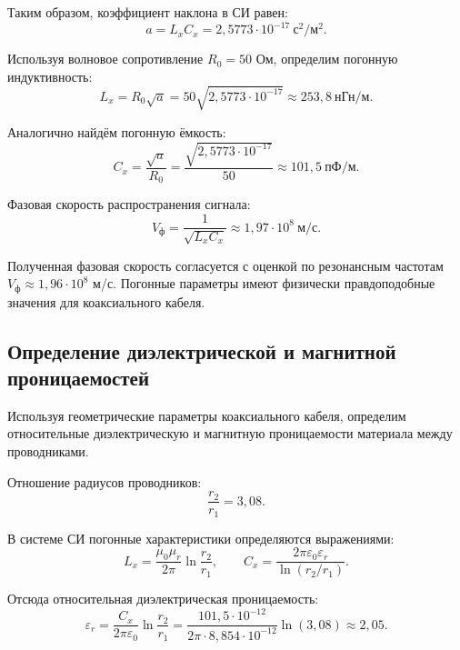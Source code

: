 \documentclass[a4paper,14pt]{extarticle}
\begin{document}
Таким образом, коэффициент наклона в СИ равен:
\begin{equation}
    a = L_xC_x = 2{,}5773\cdot10^{-17}
    \ \text{с}^2/\text{м}^2.
\end{equation}

Используя волновое сопротивление $R_0=50$ Ом,
определим погонную индуктивность:
\begin{equation}
    L_x=R_0\sqrt{a}
    =50\sqrt{2{,}5773\cdot10^{-17}}
    \approx 253{,}8\ \text{нГн/м}.
\end{equation}

Аналогично найдём погонную ёмкость:
\begin{equation}
    C_x=\frac{\sqrt{a}}{R_0}
    =\frac{\sqrt{2{,}5773\cdot10^{-17}}}{50}
    \approx 101{,}5\ \text{пФ/м}.
\end{equation}

Фазовая скорость распространения сигнала:
\begin{equation}
    V_{\text{ф}}=\frac{1}{\sqrt{L_xC_x}}
    \approx 1{,}97\cdot10^8\ \text{м/с}.
\end{equation}

Полученная фазовая скорость согласуется
с оценкой по резонансным частотам
$V_{\text{ф}}\approx1{,}96\cdot10^8$ м/с.
Погонные параметры имеют физически
правдоподобные значения для коаксиального кабеля.

\subsection{Определение диэлектрической и магнитной проницаемостей}

Используя геометрические параметры коаксиального кабеля,
определим относительные диэлектрическую и магнитную
проницаемости материала между проводниками.

Отношение радиусов проводников:
\[
    \frac{r_2}{r_1}=3{,}08.
\]

В системе СИ погонные характеристики определяются
выражениями:
\begin{equation}
    L_x=\frac{\mu_0\mu_r}{2\pi}
    \ln\frac{r_2}{r_1},
    \qquad
    C_x=\frac{2\pi\varepsilon_0\varepsilon_r}
    {\ln(r_2/r_1)}.
\end{equation}

Отсюда относительная диэлектрическая проницаемость:
\begin{equation}
    \varepsilon_r=
    \frac{C_x}{2\pi\varepsilon_0}
    \ln\frac{r_2}{r_1}
    =
    \frac{101{,}5\cdot10^{-12}}
    {2\pi\cdot8{,}854\cdot10^{-12}}
    \ln(3{,}08)
    \approx 2{,}05.
\end{equation}
\end{document}
